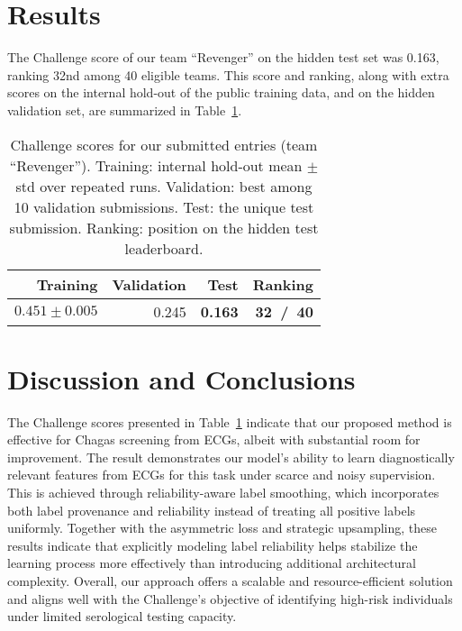 \documentclass[twocolumn]{cinc}
\begin{document}
\section{Results}
\label{sec:results}


The Challenge score of our team ``Revenger'' on the hidden test set was 0.163, ranking 32nd among 40 eligible teams. This score and ranking, along with extra scores on the internal hold-out of the public training data, and on the hidden validation set, are summarized in Table~\ref{tab:scores}.

\begin{table}[!htp]
\centering
% 
\begin{tabular}{r|r|r|r}
Training          & Validation & \textbf{Test}  & \textbf{Ranking} \\ \hline
$0.451 \pm 0.005$ & 0.245      & \textbf{0.163} & \textbf{32~/~40} \\ \hline
\end{tabular}

\caption{Challenge scores for our submitted entries (team ``Revenger''). Training: internal hold-out mean $\pm$ std over repeated runs. Validation: best among 10 validation submissions. Test: the unique test submission. Ranking: position on the hidden test leaderboard.}
\label{tab:scores}
\end{table}


\section{Discussion and Conclusions}
\label{sec:discu}


The Challenge scores presented in Table~\ref{tab:scores} indicate that our proposed method is effective for Chagas screening from ECGs, albeit with substantial room for improvement. The result demonstrates our model's ability to learn diagnostically relevant features from ECGs for this task under scarce and noisy supervision. This is achieved through reliability-aware label smoothing, which incorporates both label provenance and reliability instead of treating all positive labels uniformly. Together with the asymmetric loss and strategic upsampling, these results indicate that explicitly modeling label reliability helps stabilize the learning process more effectively than introducing additional architectural complexity. Overall, our approach offers a scalable and resource-efficient solution and aligns well with the Challenge's objective of identifying high-risk individuals under limited serological testing capacity.
\end{document}
